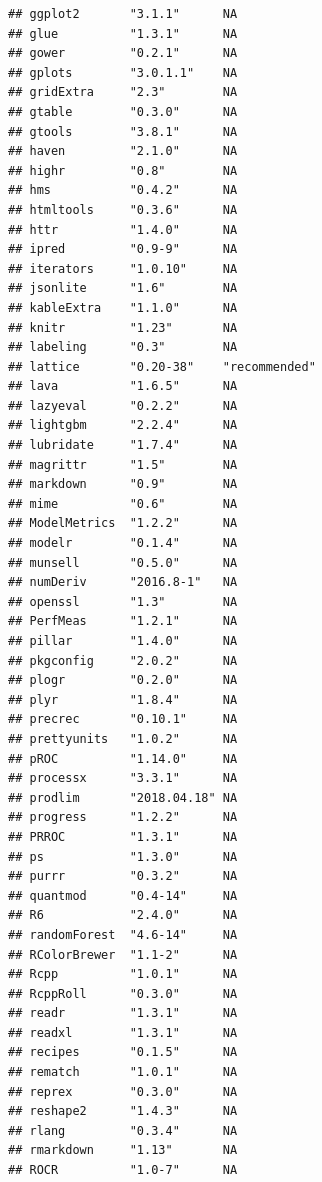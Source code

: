 \documentclass[]{article}
\begin{document}
\begin{verbatim}
## ggplot2       "3.1.1"      NA           
## glue          "1.3.1"      NA           
## gower         "0.2.1"      NA           
## gplots        "3.0.1.1"    NA           
## gridExtra     "2.3"        NA           
## gtable        "0.3.0"      NA           
## gtools        "3.8.1"      NA           
## haven         "2.1.0"      NA           
## highr         "0.8"        NA           
## hms           "0.4.2"      NA           
## htmltools     "0.3.6"      NA           
## httr          "1.4.0"      NA           
## ipred         "0.9-9"      NA           
## iterators     "1.0.10"     NA           
## jsonlite      "1.6"        NA           
## kableExtra    "1.1.0"      NA           
## knitr         "1.23"       NA           
## labeling      "0.3"        NA           
## lattice       "0.20-38"    "recommended"
## lava          "1.6.5"      NA           
## lazyeval      "0.2.2"      NA           
## lightgbm      "2.2.4"      NA           
## lubridate     "1.7.4"      NA           
## magrittr      "1.5"        NA           
## markdown      "0.9"        NA           
## mime          "0.6"        NA           
## ModelMetrics  "1.2.2"      NA           
## modelr        "0.1.4"      NA           
## munsell       "0.5.0"      NA           
## numDeriv      "2016.8-1"   NA           
## openssl       "1.3"        NA           
## PerfMeas      "1.2.1"      NA           
## pillar        "1.4.0"      NA           
## pkgconfig     "2.0.2"      NA           
## plogr         "0.2.0"      NA           
## plyr          "1.8.4"      NA           
## precrec       "0.10.1"     NA           
## prettyunits   "1.0.2"      NA           
## pROC          "1.14.0"     NA           
## processx      "3.3.1"      NA           
## prodlim       "2018.04.18" NA           
## progress      "1.2.2"      NA           
## PRROC         "1.3.1"      NA           
## ps            "1.3.0"      NA           
## purrr         "0.3.2"      NA           
## quantmod      "0.4-14"     NA           
## R6            "2.4.0"      NA           
## randomForest  "4.6-14"     NA           
## RColorBrewer  "1.1-2"      NA           
## Rcpp          "1.0.1"      NA           
## RcppRoll      "0.3.0"      NA           
## readr         "1.3.1"      NA           
## readxl        "1.3.1"      NA           
## recipes       "0.1.5"      NA           
## rematch       "1.0.1"      NA           
## reprex        "0.3.0"      NA           
## reshape2      "1.4.3"      NA           
## rlang         "0.3.4"      NA           
## rmarkdown     "1.13"       NA           
## ROCR          "1.0-7"      NA           

\end{verbatim}
\end{document}
